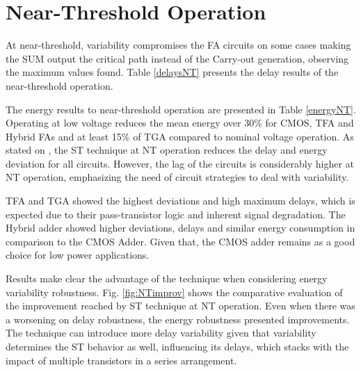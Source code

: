 \documentclass[ecp,tc, english]{iiufrgs}
\begin{document}
\section{Near-Threshold Operation}

At near-threshold, variability compromises the FA circuits on some cases making the SUM output the critical path instead of the Carry-out generation, observing the maximum values found. Table \ref{delaysNT} presents the delay results of the near-threshold operation. 

The energy results to near-threshold operation are presented in Table \ref{energyNT}. Operating at low voltage reduces the mean energy over 30\% for CMOS, TFA and Hybrid FAs and at least 15\% of TGA compared to nominal voltage operation. As stated on \cite{dokania2015circuit}, the ST technique at NT operation reduces the delay and energy deviation for all circuits. However, the lag of the circuits is considerably higher at NT operation, emphasizing the need of circuit strategies to deal with variability. 

TFA and TGA showed the highest deviations and high maximum delays, which is expected due to their pass-transistor logic and inherent signal degradation. The Hybrid adder showed higher deviations, delays and similar energy consumption in comparison to the CMOS Adder. Given that, the CMOS adder remains as a good choice for low power applications.

Results make clear the advantage of the technique when considering energy variability robustness. Fig. \ref{fig:NTimprov} shows the comparative evaluation of the improvement reached by ST technique at NT operation. Even when there was a worsening on delay robustness, the energy robustness presented improvements. The technique can introduce more delay variability given that variability determines the ST behavior as well, influencing its delays, which stacks with the impact of multiple transistors in a series arrangement.
\end{document}
